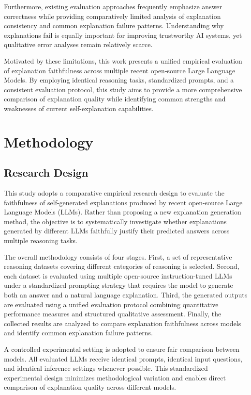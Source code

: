 \documentclass{article}
\begin{document}
Furthermore, existing evaluation approaches frequently emphasize answer correctness while providing comparatively limited analysis of explanation consistency and common explanation failure patterns. Understanding why explanations fail is equally important for improving trustworthy AI systems, yet qualitative error analyses remain relatively scarce.

Motivated by these limitations, this work presents a unified empirical evaluation of explanation faithfulness across multiple recent open-source Large Language Models. By employing identical reasoning tasks, standardized prompts, and a consistent evaluation protocol, this study aims to provide a more comprehensive comparison of explanation quality while identifying common strengths and weaknesses of current self-explanation capabilities.





\section{Methodology}

\subsection{Research Design}

This study adopts a comparative empirical research design to evaluate the faithfulness of self-generated explanations produced by recent open-source Large Language Models (LLMs). Rather than proposing a new explanation generation method, the objective is to systematically investigate whether explanations generated by different LLMs faithfully justify their predicted answers across multiple reasoning tasks.

The overall methodology consists of four stages. First, a set of representative reasoning datasets covering different categories of reasoning is selected. Second, each dataset is evaluated using multiple open-source instruction-tuned LLMs under a standardized prompting strategy that requires the model to generate both an answer and a natural language explanation. Third, the generated outputs are evaluated using a unified evaluation protocol combining quantitative performance measures and structured qualitative assessment. Finally, the collected results are analyzed to compare explanation faithfulness across models and identify common explanation failure patterns.

A controlled experimental setting is adopted to ensure fair comparison between models. All evaluated LLMs receive identical prompts, identical input questions, and identical inference settings whenever possible. This standardized experimental design minimizes methodological variation and enables direct comparison of explanation quality across different models.
\end{document}
